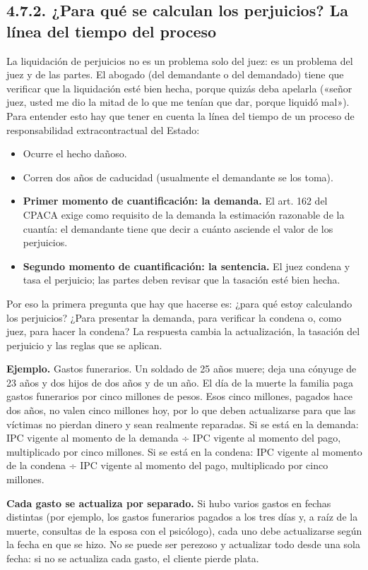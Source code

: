 \subsection{4.7.2. ¿Para qué se calculan los perjuicios? La línea del tiempo del proceso}
La liquidación de perjuicios no es un problema solo del juez: es un problema del juez y de las partes. El abogado (del demandante o del demandado) tiene que verificar que la liquidación esté bien hecha, porque quizás deba apelarla («señor juez, usted me dio la mitad de lo que me tenían que dar, porque liquidó mal»). Para entender esto hay que tener en cuenta la línea del tiempo de un proceso de responsabilidad extracontractual del Estado:

\begin{itemize}
\item Ocurre el hecho dañoso.
\item Corren dos años de caducidad (usualmente el demandante se los toma).
\item \textbf{Primer momento de cuantificación: la demanda.} El art. 162 del CPACA exige como requisito de la demanda la estimación razonable de la cuantía: el demandante tiene que decir a cuánto asciende el valor de los perjuicios.
\item \textbf{Segundo momento de cuantificación: la sentencia.} El juez condena y tasa el perjuicio; las partes deben revisar que la tasación esté bien hecha.
\end{itemize}
Por eso la primera pregunta que hay que hacerse es: ¿para qué estoy calculando los perjuicios? ¿Para presentar la demanda, para verificar la condena o, como juez, para hacer la condena? La respuesta cambia la actualización, la tasación del perjuicio y las reglas que se aplican.

\begin{ejemplo}
\textcolor[HTML]{4F6228}{\textbf{Ejemplo. }}Gastos funerarios. Un soldado de 25 años muere; deja una cónyuge de 23 años y dos hijos de dos años y de un año. El día de la muerte la familia paga gastos funerarios por cinco millones de pesos. Esos cinco millones, pagados hace dos años, no valen cinco millones hoy, por lo que deben actualizarse para que las víctimas no pierdan dinero y sean realmente reparadas. Si se está en la demanda: IPC vigente al momento de la demanda ÷ IPC vigente al momento del pago, multiplicado por cinco millones. Si se está en la condena: IPC vigente al momento de la condena ÷ IPC vigente al momento del pago, multiplicado por cinco millones.
\end{ejemplo}
\textbf{Cada gasto se actualiza por separado.} Si hubo varios gastos en fechas distintas (por ejemplo, los gastos funerarios pagados a los tres días y, a raíz de la muerte, consultas de la esposa con el psicólogo), cada uno debe actualizarse según la fecha en que se hizo. No se puede ser perezoso y actualizar todo desde una sola fecha: si no se actualiza cada gasto, el cliente pierde plata.

